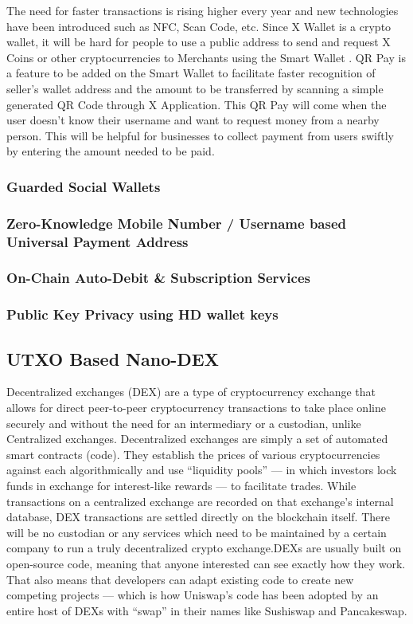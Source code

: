 \documentclass[letterpaper,11pt]{article}
\begin{document}
The need for faster transactions is rising higher every year and new technologies have been introduced such as NFC, Scan Code, etc. Since X Wallet is a crypto wallet, it will be hard for people to use a public address to send and request X Coins or other cryptocurrencies to Merchants using the Smart Wallet . QR Pay is a feature to be added on the Smart Wallet to facilitate faster recognition of seller’s wallet address and the amount to be transferred by scanning a simple generated QR Code through X Application. This QR Pay will come when the user doesn’t know their username and want to request money from a nearby person. This will be helpful for businesses to collect payment from users swiftly by entering the amount needed to be paid.\\
	
		\subsubsection{Guarded Social Wallets}
	
		\subsubsection{Zero-Knowledge Mobile Number / Username based Universal Payment Address}
	
		\subsubsection{On-Chain Auto-Debit \& Subscription Services}
		
		\subsubsection{Public Key Privacy using HD wallet keys}
		
		
\subsection{UTXO Based Nano-DEX}	

Decentralized exchanges (DEX) are a type of cryptocurrency exchange that allows for direct peer-to-peer cryptocurrency transactions to take place online securely and without the need for an intermediary or a custodian, unlike Centralized exchanges. Decentralized exchanges are simply a set of automated smart contracts (code). They establish the prices of various cryptocurrencies against each algorithmically and use “liquidity pools” — in which investors lock funds in exchange for interest-like rewards — to facilitate trades. While transactions on a centralized exchange are recorded on that exchange’s internal database, DEX transactions are settled directly on the blockchain itself. There will be no custodian or any services which need to be maintained by a certain company to run a truly decentralized crypto exchange.DEXs are usually built on open-source code, meaning that anyone interested can see exactly how they work. That also means that developers can adapt existing code to create new competing projects — which is how Uniswap’s code has been adopted by an entire host of DEXs with “swap” in their names like Sushiswap and Pancakeswap.\\
\end{document}
